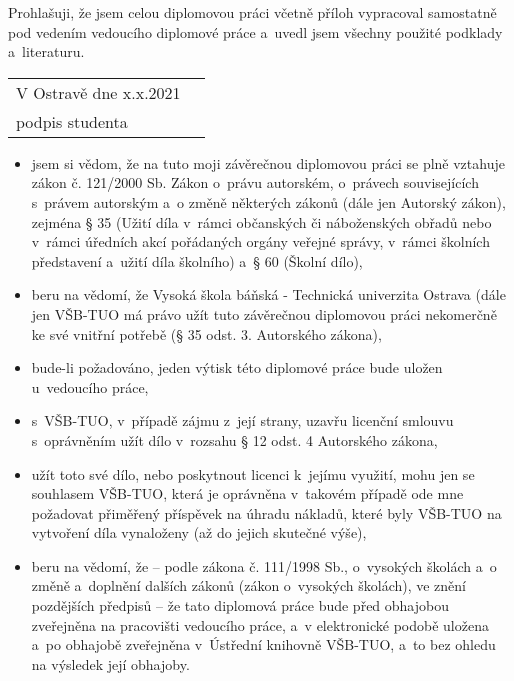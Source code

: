 \documentclass[main.tex]{subfiles}
\begin{document}
\newpage\null
\vfill
{}
\bigskip

\noindent Prohlašuji, že jsem celou diplomovou práci včetně příloh vypracoval samostatně pod vedením vedoucího diplomové práce a~uvedl jsem všechny použité podklady a~literaturu.

\vspace{3em}

\noindent
\begin{tabularx}{\textwidth}{@{}Xl}
V Ostravě dne x.x.2021 & 
\begin{tabular}[t]{c}
  ..................................... \\[-10pt]
  podpis studenta
\end{tabular} \\
\end{tabularx}
\clearpage
{}
\bigskip

\begin{itemize}
\item jsem si vědom, že na tuto moji závěrečnou diplomovou práci se plně vztahuje zákon č. 121/2000 Sb. Zákon o~právu autorském, o~právech souvisejících s~právem autorským a~o změně některých zákonů (dále jen Autorský zákon), zejména § 35 (Užití díla v~rámci občanských či náboženských obřadů nebo v~rámci úředních akcí pořádaných orgány veřejné správy, v~rámci školních představení a~užití díla školního) a~§ 60 (Školní dílo),
\item beru na vědomí, že Vysoká škola báňská - Technická univerzita Ostrava (dále jen VŠB-TUO má právo užít tuto závěrečnou diplomovou práci nekomerčně ke své vnitřní potřebě (§ 35 odst. 3. Autorského zákona),
\item bude-li požadováno, jeden výtisk této diplomové práce bude uložen u~vedoucího práce,
\item s~VŠB-TUO, v~případě zájmu z~její strany, uzavřu licenční smlouvu s~oprávněním užít dílo v~rozsahu § 12 odst. 4 Autorského zákona,
\item užít toto své dílo, nebo poskytnout licenci k~jejímu využití, mohu jen se souhlasem VŠB-TUO, která je oprávněna v~takovém případě ode mne požadovat přiměřený příspěvek na úhradu nákladů, které byly VŠB-TUO na vytvoření díla vynaloženy (až do jejich skutečné výše),
\item beru na vědomí, že -- podle zákona č. 111/1998 Sb., o~vysokých školách a~o změně a~doplnění dalších zákonů (zákon o~vysokých školách), ve znění pozdějších předpisů -- že tato diplomová práce bude před obhajobou zveřejněna na pracovišti vedoucího práce, a~v elektronické podobě uložena a~po obhajobě zveřejněna v~Ústřední knihovně VŠB-TUO, a~to bez ohledu na výsledek její obhajoby.
\end{itemize}
\end{document}

